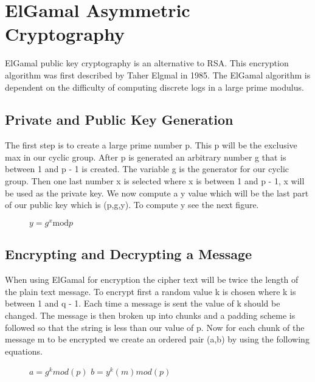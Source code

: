 \documentclass[conference]{IEEEtran}
\begin{document}
\section{ElGamal Asymmetric Cryptography}
ElGamal public key cryptography is an alternative to RSA. This encryption algorithm was first described by Taher Elgmal in 1985. The ElGamal algorithm is dependent on the difficulty of computing discrete logs in a large prime modulus.

\subsection{Private and Public Key Generation}
The first step is to create a large prime number p. This p will be the exclusive max in our cyclic group. After p is generated an arbitrary number g that is between 1 and p - 1 is created. The variable g is the generator for our cyclic group. Then one last number x is selected where x is between 1 and p - 1, x will be used as the private key. We now compute a y value which will be the last part of our public key which is (p,g,y). To compute y see the next figure.

\begin{figure}[h]
	\begin{center}
		$y={g}^{x}\mathrm{mod}p$
	\end{center}	
\end{figure}


\subsection{Encrypting and Decrypting a Message}

When using ElGamal for encryption the cipher text will be twice the length of the plain text message. 
To encrypt first a random value k is chosen where k is between 1 and q - 1. Each time a message is sent the value of k should be changed. The message is then broken up into chunks and a padding scheme is followed so that the string is less than our value of p. Now for each chunk of the message m to be encrypted we create an ordered pair (a,b) by using the following equations.

\begin{figure}[h]
	\begin{center}
		$a={g}^{k}mod\left(p\right)$ \newline
		$b={y}^{k}\left(m\right)mod\left(p\right)$ \newline
	\end{center}
\end{figure}
\end{document}
